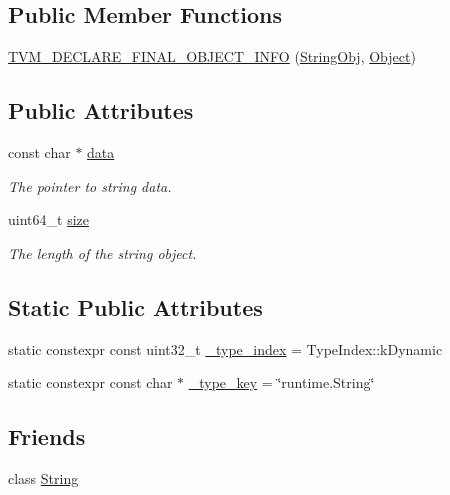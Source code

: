 \subsection*{Public Member Functions}
\begin{DoxyCompactItemize}
\item 
\hyperlink{classtvm_1_1runtime_1_1StringObj_ae47e92e40537956f9ff676b9eec7ac01}{T\+V\+M\+\_\+\+D\+E\+C\+L\+A\+R\+E\+\_\+\+F\+I\+N\+A\+L\+\_\+\+O\+B\+J\+E\+C\+T\+\_\+\+I\+N\+FO} (\hyperlink{classtvm_1_1runtime_1_1StringObj}{String\+Obj}, \hyperlink{classtvm_1_1runtime_1_1Object}{Object})
\end{DoxyCompactItemize}
\subsection*{Public Attributes}
\begin{DoxyCompactItemize}
\item 
const char $\ast$ \hyperlink{classtvm_1_1runtime_1_1StringObj_a4ab9dd883ceed3efccf663acfbcd152f}{data}
\begin{DoxyCompactList}\small\item\em The pointer to string data. \end{DoxyCompactList}\item 
uint64\+\_\+t \hyperlink{classtvm_1_1runtime_1_1StringObj_a866c6a8805c30f6cc4faac2298985d23}{size}
\begin{DoxyCompactList}\small\item\em The length of the string object. \end{DoxyCompactList}\end{DoxyCompactItemize}
\subsection*{Static Public Attributes}
\begin{DoxyCompactItemize}
\item 
static constexpr const uint32\+\_\+t \hyperlink{classtvm_1_1runtime_1_1StringObj_a9d0bb5c54d59456980767be2398dbc16}{\+\_\+type\+\_\+index} = Type\+Index\+::k\+Dynamic
\item 
static constexpr const char $\ast$ \hyperlink{classtvm_1_1runtime_1_1StringObj_a4b4433ded5abdaae4ac417cee103f8d2}{\+\_\+type\+\_\+key} = \char`\"{}runtime.\+String\char`\"{}
\end{DoxyCompactItemize}
\subsection*{Friends}
\begin{DoxyCompactItemize}
\item 
class \hyperlink{classtvm_1_1runtime_1_1StringObj_a7fb804f7dc96dd9f705c84095f37f1ca}{String}
\end{DoxyCompactItemize}

